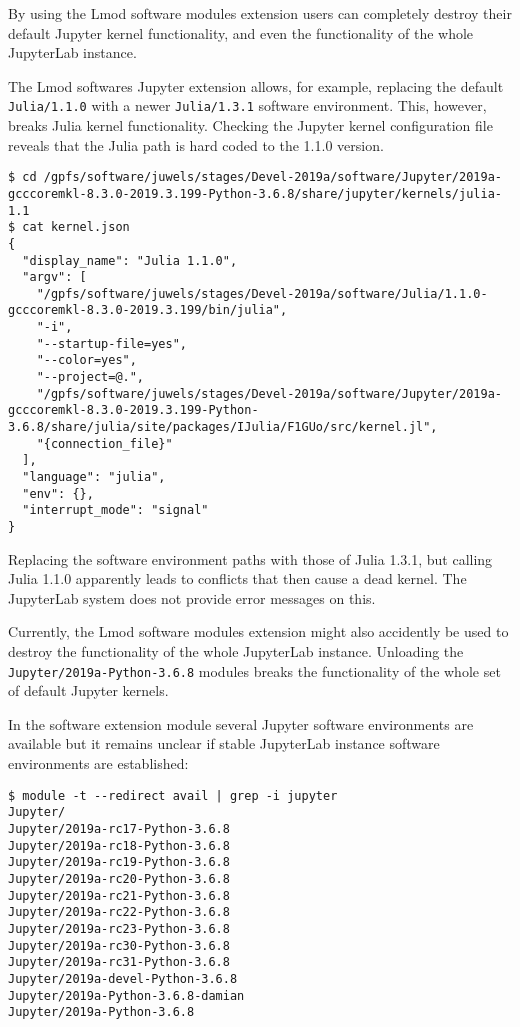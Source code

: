 By using the Lmod software modules extension users can completely destroy their default Jupyter kernel functionality, and even the functionality of the whole JupyterLab instance.

The Lmod softwares Jupyter extension allows, for example, replacing the default \verb|Julia/1.1.0| with a newer \verb|Julia/1.3.1| software environment.
This, however, breaks Julia kernel functionality.
Checking the Jupyter kernel configuration file reveals that the Julia path is hard coded to the 1.1.0 version.
%
\begin{verbatim}
$ cd /gpfs/software/juwels/stages/Devel-2019a/software/Jupyter/2019a-gcccoremkl-8.3.0-2019.3.199-Python-3.6.8/share/jupyter/kernels/julia-1.1
$ cat kernel.json
{
  "display_name": "Julia 1.1.0",
  "argv": [
    "/gpfs/software/juwels/stages/Devel-2019a/software/Julia/1.1.0-gcccoremkl-8.3.0-2019.3.199/bin/julia",
    "-i",
    "--startup-file=yes",
    "--color=yes",
    "--project=@.",
    "/gpfs/software/juwels/stages/Devel-2019a/software/Jupyter/2019a-gcccoremkl-8.3.0-2019.3.199-Python-3.6.8/share/julia/site/packages/IJulia/F1GUo/src/kernel.jl",
    "{connection_file}"
  ],
  "language": "julia",
  "env": {},
  "interrupt_mode": "signal"
}
\end{verbatim}
%
Replacing the software environment paths with those of Julia 1.3.1, but calling Julia 1.1.0 apparently leads to conflicts that then cause a dead kernel.
The JupyterLab system does not provide error messages on this.

Currently, the Lmod software modules extension might also accidently be used to destroy the functionality of the whole JupyterLab instance.
Unloading the \verb|Jupyter/2019a-Python-3.6.8| modules breaks the functionality of the whole set of default Jupyter kernels.

In the software extension module several Jupyter software environments are available but it remains unclear if stable JupyterLab instance software environments are established:
%
\begin{verbatim}
$ module -t --redirect avail | grep -i jupyter
Jupyter/
Jupyter/2019a-rc17-Python-3.6.8
Jupyter/2019a-rc18-Python-3.6.8
Jupyter/2019a-rc19-Python-3.6.8
Jupyter/2019a-rc20-Python-3.6.8
Jupyter/2019a-rc21-Python-3.6.8
Jupyter/2019a-rc22-Python-3.6.8
Jupyter/2019a-rc23-Python-3.6.8
Jupyter/2019a-rc30-Python-3.6.8
Jupyter/2019a-rc31-Python-3.6.8
Jupyter/2019a-devel-Python-3.6.8
Jupyter/2019a-Python-3.6.8-damian
Jupyter/2019a-Python-3.6.8
\end{verbatim}

